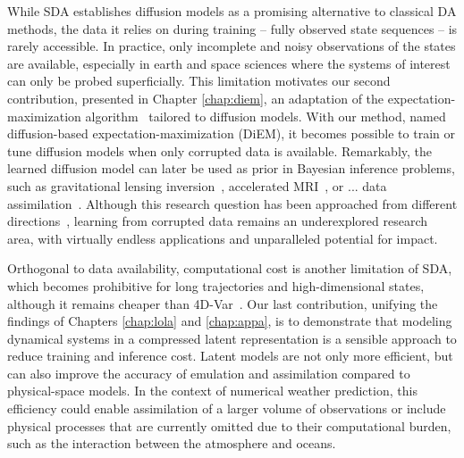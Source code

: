 While SDA establishes diffusion models as a promising alternative to classical DA methods, the data it relies on during training -- fully observed state sequences -- is rarely accessible. In practice, only incomplete and noisy observations of the states are available, especially in earth and space sciences where the systems of interest can only be probed superficially. This limitation motivates our second contribution, presented in Chapter \ref{chap:diem}, an adaptation of the expectation-maximization algorithm~\cite{hartley1958maximum, dempster1977maximum, wu1983convergence, mclachlan2007em, balakrishnan2017statistical} tailored to diffusion models. With our method, named diffusion-based expectation-maximization (DiEM), it becomes possible to train or tune diffusion models when only corrupted data is available. Remarkably, the learned diffusion model can later be used as prior in Bayesian inference problems, such as gravitational lensing inversion~\cite{warren2003semilinear, morningstar2019datadriven, mishra-sharma2022strong}, accelerated MRI~\cite{wang2016accelerating, hammernik2018learning, han2020kspace, zbontar2018fastmri, knoll2020fastmri}, or ... data assimilation~\cite{ledimet1986variational, tremolet2006accounting, hamill2006ensemblebased, evensen2009data, carrassi2018data}. Although this research question has been approached from different directions~\cite{aali2023solving, daras2023ambient, daras2024consistent, kawar2024gsurebased}, learning from corrupted data remains an underexplored research area, with virtually endless applications and unparalleled potential for impact.

Orthogonal to data availability, computational cost is another limitation of SDA, which becomes prohibitive for long trajectories and high-dimensional states, although it remains cheaper than 4D-Var~\cite{tremolet2006accounting, tremolet2007modelerror}. Our last contribution, unifying the findings of Chapters \ref{chap:lola} and \ref{chap:appa}, is to demonstrate that modeling dynamical systems in a compressed latent representation is a sensible approach to reduce training and inference cost. Latent models are not only more efficient, but can also improve the accuracy of emulation and assimilation compared to physical-space models. In the context of numerical weather prediction, this efficiency could enable assimilation of a larger volume of observations or include physical processes that are currently omitted due to their computational burden, such as the interaction between the atmosphere and oceans.

